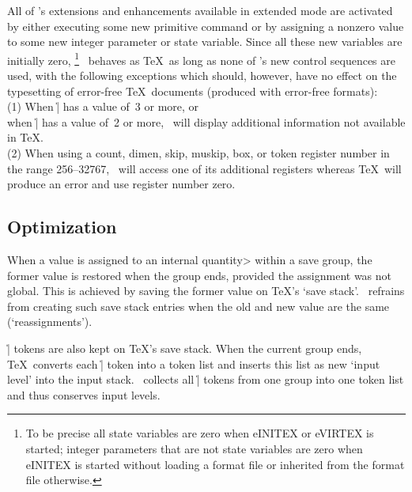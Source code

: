 \documentclass{article}
\begin{document}
All of \eTeX's extensions and enhancements available in extended mode are
activated by either executing some new primitive command or by assigning
a nonzero value to some new integer parameter or state variable. Since
all these new variables are initially zero,%
\footnote{To be precise all state variables are zero when eINITEX or eVIRTEX
is started; integer parameters that are not state variables are zero when
eINITEX is started without loading a format file or inherited from the
format file otherwise.}
\eTeX\ behaves as \TeX\ as long as none of \eTeX's new control sequences
are used, with the following exceptions which should, however, have
no effect on the typesetting of error-free \TeX\ documents (produced with
error-free formats):\\
(1) When \|\tracingcommands| has a value of~3 or more, or\\
when \|\tracinglostchars| has a value of~2 or more, \eTeX\ will display
additional information not available in \TeX.\\
(2) When using a count, dimen, skip, muskip, box, or token register number
in the range 256--32767, \eTeX\ will access one of its additional registers
whereas \TeX\ will produce an error and use register number zero.

\subsection{Optimization}

When a value is assigned to an \<internal quantity> within a save group,
the former value is restored when the group ends, provided the
assignment was not global. This is achieved by saving the former value
on \TeX's `save stack'. \eTeX\ refrains from creating such save stack
entries when the old and new value are the same (`reassignments').

\|\aftergroup| tokens are also kept on \TeX's save stack.  When the
current group ends, \TeX\ converts each \|\aftergroup| token into a
token list and inserts this list as new `input level' into the input stack.
\eTeX\ collects all \|\aftergroup| tokens from one group into one token
list and thus conserves input levels.
\end{document}
